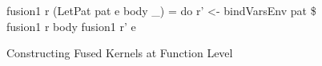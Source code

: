 \documentclass{sigplanconf}  %
\newcommand{\emp}[1]{\textcolor{DikuRed}{ #1}}
\newcommand{\emphh}[1]{\textcolor{CosGreen}{ #1}}
\newcommand{\mymath}[1]{$ #1 $}
\begin{document}
\begin{figure}[bt]
{\begin{colorcode}
fusion1 r (LetPat pat e body _) = do
    r' <- \emphh{bindVarsEnv} pat \$ fusion1 r body
    fusion1 r' e
\end{colorcode}
} \vspace{-2ex}
\caption{ Constructing Fused Kernels at Function Level}
\label{fig:FusionGather}
\end{figure}






%

\end{document}
